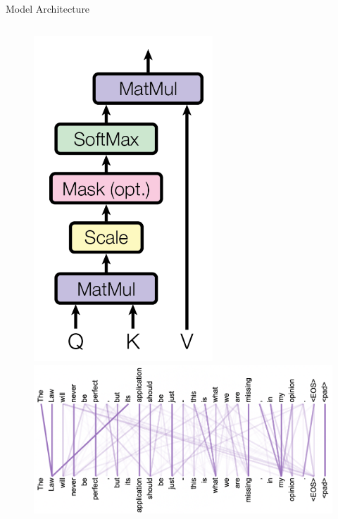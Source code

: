 \documentclass[10pt]{beamer}
\begin{document}
\begin{frame}[fragile]{Model Architecture}
\begin{columns}
\begin{column}{0.38\textwidth}
\begin{figure}
    \centering
    \includegraphics[width=0.6\textwidth]{figures/model/scaled_dot_production_in_paper.png}
    \includegraphics[width=\textwidth]{figures/model/attn-vis.png}
\end{figure}
\end{column}

\end{columns}

\end{frame}
\end{document}
